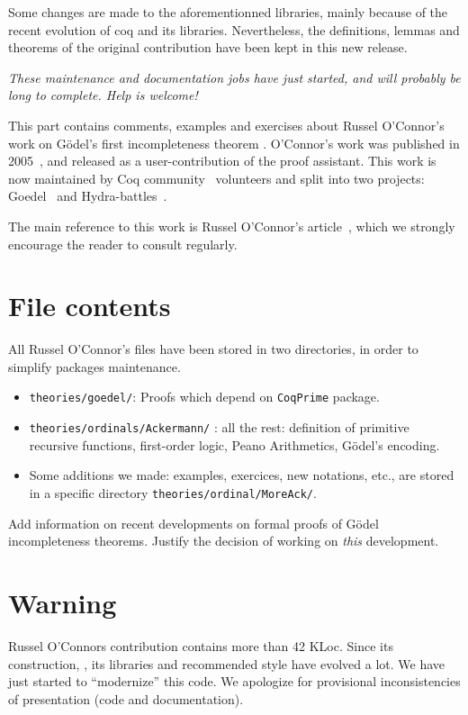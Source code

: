 Some changes are made to the aforementionned libraries, mainly because of the recent evolution of coq and its libraries. Nevertheless, the definitions, lemmas and theorems of the original contribution have been kept in this new release.

\emph{\color{red!80}These maintenance and documentation 
jobs have just started, and will probably be long to complete. Help is welcome!}

This part contains comments, examples  and exercises about Russel O'Connor's work on G\"{o}del's first incompleteness theorem  \cite{Godel1986-GDECW}.
O'Connor's work was published in 2005~\cite{OConnor05}, and released as a user-contribution of the \coq proof assistant.
This work is now maintained by Coq community~\cite{CoqCommunity} volunteers and split into two projects: Goedel~\cite{Goedel} and Hydra-battles~\cite{HydraBattles}.

The main reference to this work is  Russel O'Connor's article~\cite{OConnor05}, which we strongly encourage the reader to 
consult regularly. 




\section{File contents}

All Russel O'Connor's files have been stored in two directories, in order to simplify packages maintenance. 

\begin{itemize}
\item \texttt{theories/goedel/}: Proofs which depend on 
\texttt{CoqPrime} package.
\item  \texttt{theories/ordinals/Ackermann/} : all the rest:
 definition of primitive recursive functions, first-order  logic,
Peano Arithmetics, G\"{o}del's encoding.
\item Some additions we made: examples, exercices, new notations, etc.,  are stored in a specific directory \texttt{theories/ordinal/MoreAck/}.
\end{itemize}


\begin{todo}
Add information on recent developments on formal 
proofs of G\"odel  incompleteness theorems. Justify the decision of working on \emph{this} development.  
\end{todo}

\section{Warning}
Russel O'Connors contribution contains more than 42 KLoc.
Since its construction, \coq{},  its libraries and recommended style have evolved a lot. We have just started to ``modernize'' this code. We apologize for provisional inconsistencies of presentation (code and documentation).
